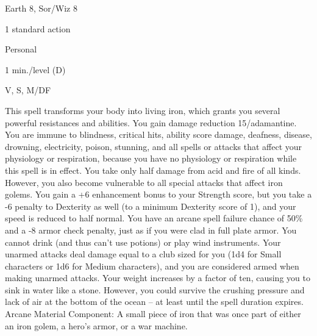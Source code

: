 
\begin{description*}
\item[Level:] Earth 8, Sor/Wiz 8
\item[Casting Time:] 1 standard action
\item[Range:] Personal
\item[Duration:] 1 min./level (D)
\item[Components:] V, S, M/DF
\end{description*}

This spell transforms your body into living iron, which grants you several powerful
resistances and abilities.
You gain damage reduction 15/adamantine. You are immune to blindness, critical
hits, ability score damage, deafness, disease, drowning, electricity, poison, stunning,
and all spells or attacks that affect your physiology or respiration, because you
have no physiology or respiration while this spell is in effect. You take only
half damage from acid and fire of all kinds. However, you also become vulnerable
to all special attacks that affect iron golems.
You gain a +6 enhancement bonus to your Strength score, but you take a -6 penalty
to Dexterity as well (to a minimum Dexterity score of 1), and your speed is reduced
to half normal. You have an arcane spell failure chance of 50\% and a -8 armor
check penalty, just as if you were clad in full plate armor. You cannot drink (and
thus can't use potions) or play wind instruments.
Your unarmed attacks deal damage equal to a club sized for you (1d4 for Small characters
or 1d6 for Medium characters), and you are considered armed when making unarmed
attacks.
Your weight increases by a factor of ten, causing you to sink in water like a stone.
However, you could survive the crushing pressure and lack of air at the bottom
of the ocean -- at least until the spell duration expires.
Arcane Material Component: A small piece of iron that was once part of
either an iron golem, a hero's armor, or a war machine.
